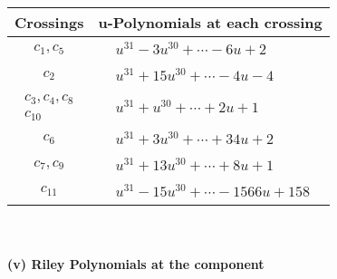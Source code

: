 \documentclass[1p]{elsarticle_modified}
\theoremstyle{definition}
\begin{document}
\begin{tabular}{m{50pt}|m{274pt}}
Crossings & \hspace{64pt}u-Polynomials at each crossing \\
\hline $$\begin{aligned}c_{1},c_{5}\end{aligned}$$&$\begin{aligned}
&u^{31}-3 u^{30}+\cdots-6 u+2
\end{aligned}$\\
\hline $$\begin{aligned}c_{2}\end{aligned}$$&$\begin{aligned}
&u^{31}+15 u^{30}+\cdots-4 u-4
\end{aligned}$\\
\hline $$\begin{aligned}c_{3},c_{4},c_{8}\\c_{10}\end{aligned}$$&$\begin{aligned}
&u^{31}+u^{30}+\cdots+2 u+1
\end{aligned}$\\
\hline $$\begin{aligned}c_{6}\end{aligned}$$&$\begin{aligned}
&u^{31}+3 u^{30}+\cdots+34 u+2
\end{aligned}$\\
\hline $$\begin{aligned}c_{7},c_{9}\end{aligned}$$&$\begin{aligned}
&u^{31}+13 u^{30}+\cdots+8 u+1
\end{aligned}$\\
\hline $$\begin{aligned}c_{11}\end{aligned}$$&$\begin{aligned}
&u^{31}-15 u^{30}+\cdots-1566 u+158
\end{aligned}$\\
\hline
\end{tabular}\\~\\
\newpage\renewcommand{\arraystretch}{1}
\flushleft \textbf{(v) Riley Polynomials at the component}\newline \\
\end{document}
